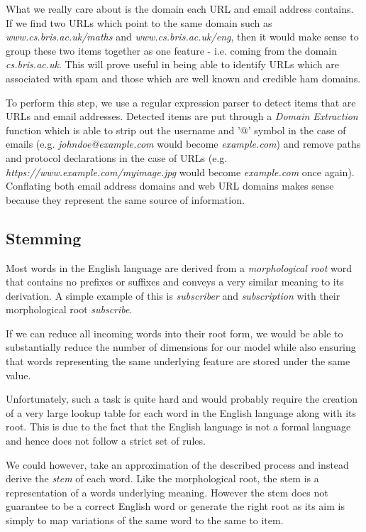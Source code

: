 What we really care about is the domain each URL and email address contains. If we find two URLs which point to the same domain such as \emph{www.cs.bris.ac.uk/maths} and \emph{www.cs.bris.ac.uk/eng}, then it would make sense to group these two items together as one feature - i.e. coming from the domain \emph{cs.bris.ac.uk}. This will prove useful in being able to identify URLs which are associated with spam and those which are well known and credible ham domains.

To perform this step, we use a regular expression parser to detect items that are URLs and email addresses. Detected items are put through a \emph{Domain Extraction} function which is able to strip out the username and '@' symbol in the case of emails (e.g. \emph{johndoe@example.com} would become \emph{example.com}) and remove paths and protocol declarations in the case of URLs (e.g. \emph{https://www.example.com/myimage.jpg} would become \emph{example.com} once again). Conflating both email address domains and web URL domains makes sense because they represent the same source of information.


\subsection{Stemming}
Most words in the English language are derived from a \emph{morphological root} word that contains no prefixes or suffixes and conveys a very similar meaning to its derivation. A simple example of this is \emph{subscriber} and \emph{subscription} with their morphological root \emph{subscribe}. 

If we can reduce all incoming words into their root form, we would be able to substantially reduce the number of dimensions for our model while also ensuring that words representing the same underlying feature are stored under the same value.

Unfortunately, such a task is quite hard and would probably require the creation of a very large lookup table for each word in the English language along with its root. This is due to the fact that the English language is not a formal language and hence does not follow a strict set of rules. 

We could however, take an approximation of the described process and instead derive the \emph{stem} of each word. Like the morphological root, the stem is a representation of a words underlying meaning. However the stem does not guarantee to be a correct English word or generate the right root as its aim is simply to map variations of the same word to the same to item. 

